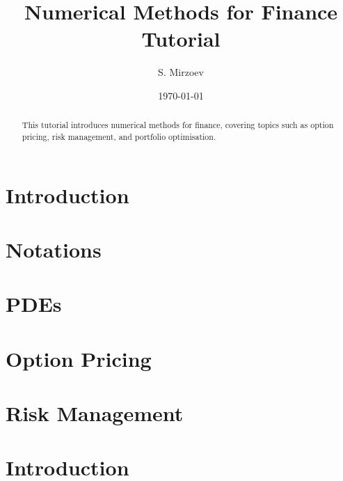 \documentclass{article}
\title{Numerical Methods for Finance Tutorial}
\author{S. Mirzoev}
\date{\today}
\begin{document}
\maketitle

\begin{abstract}
This tutorial introduces numerical methods for finance, covering topics such as option pricing, risk management, and portfolio optimisation.
\end{abstract}

\section{Introduction}


\section{Notations}


\section{PDEs}


\section{Option Pricing}
% 

\section{Risk Management}
% 


\section{Introduction}
\end{document}
